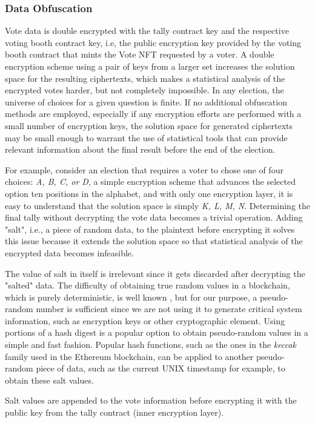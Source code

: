 \documentclass[../main.tex]{subfiles}
\begin{document}
    \subsubsection{Data Obfuscation}
        Vote data is double encrypted with the tally contract key and the respective voting booth contract key, i.e, the public encryption key provided by the voting booth contract that mints the Vote NFT requested by a voter. A double encryption scheme using a pair of keys from a larger set increases the solution space for the resulting ciphertexts, which makes a statistical analysis of the encrypted votes harder, but not completely impossible. In any election, the universe of choices for a given question is finite. If no additional obfuscation methods are employed, especially if any encryption efforts are performed with a small number of encryption keys, the solution space for generated ciphertexts may be small enough to warrant the use of statistical tools that can provide relevant information about the final result before the end of the election.
        \par
        For example, consider an election that requires a voter to chose one of four choices: \textit{A, B, C, or D}, a simple encryption scheme that advances the selected option ten positions in the alphabet, and with only one encryption layer, it is easy to understand that the solution space is simply \textit{K, L, M, N}. Determining the final tally without decrypting the vote data becomes a trivial operation. Adding "salt", i.e., a piece of random data, to the plaintext before encrypting it solves this issue because it extends the solution space so that statistical analysis of the encrypted data becomes infeasible.
        \par
        The value of salt in itself is irrelevant since it gets discarded after decrypting the "salted" data. The difficulty of obtaining true random values in a blockchain, which is purely deterministic, is well known \cite{Antonopoulos2018}, but for our purpose, a pseudo-random number is sufficient since we are not using it to generate critical system information, such as encryption keys or other cryptographic element. Using portions of a hash digest is a popular option to obtain pseudo-random values in a simple and fast fashion. Popular hash functions, such as the ones in the \textit{keccak} family used in the Ethereum blockchain, can be applied to another pseudo-random piece of data, such as the current UNIX timestamp for example, to obtain these salt values.
        \par
        Salt values are appended to the vote information before encrypting it with the public key from the tally contract (inner encryption layer).
\end{document}
